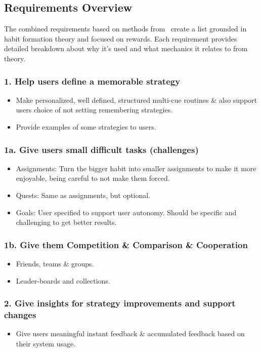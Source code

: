 \subsection{Requirements Overview}

The combined requirements based on methods from~\cite{thesis_kathy, article_taxonomy_motivational_affordances_meaningful} create a list grounded in habit formation theory and focused on rewards. Each requirement provides detailed breakdown about why it's used and what mechanics it relates to from theory.

\subsubsection*{1. Help users define a memorable strategy}
  \begin{itemize}
    \item Make personalized, well defined, structured multi-cue routines \& also support users choice of not setting remembering strategies.
    \item Provide examples of some strategies to users.
  \end{itemize}

\subsubsection*{1a. Give users small difficult tasks (challenges)}
  \begin{itemize}
    \item Assignments: Turn the bigger habit into smaller assignments to make it more enjoyable, being careful to not make them forced.
    \item Quests: Same as assignments, but optional.
    \item Goals: User specified to support user autonomy. Should be specific and challenging to get better results.
  \end{itemize}

\subsubsection*{1b. Give them Competition \& Comparison \& Cooperation}
  \begin{itemize}
    \item Friends, teams \& groups.
    \item Leader-boards and collections.
  \end{itemize}

\subsubsection*{2. Give insights for strategy improvements and support changes}
  \begin{itemize}
    \item Give users meaningful instant feedback \& accumulated feedback based on their system usage.
  \end{itemize}

